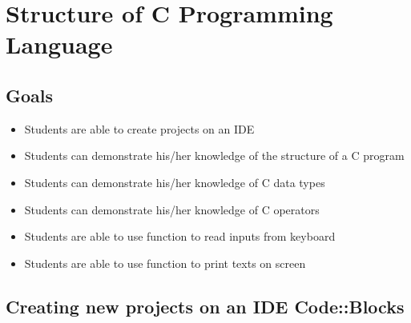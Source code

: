 \chapter{Structure of C Programming Language}
\section{Goals}
\begin{itemize}
	\item Students are able to create projects on an IDE
	\item Students can demonstrate his/her knowledge of the structure of a C program
	\item Students can demonstrate his/her knowledge of C data types
	\item Students can demonstrate his/her knowledge of C operators
    \item Students are able to use function to read inputs from keyboard
    \item Students are able to use function to print texts on screen
\end{itemize}
\section{Creating new projects on an IDE Code::Blocks}
